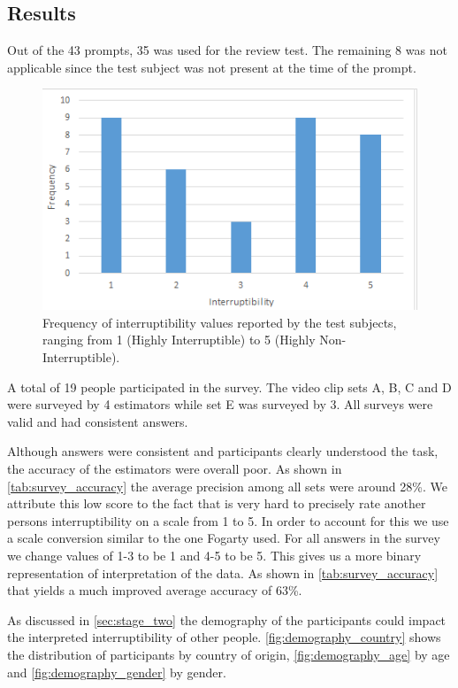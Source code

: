 \documentclass{sigchi}
\begin{document}
\subsection{Results}
Out of the 43 prompts, 35 was used for the review test.
The remaining 8 was not applicable since the test subject was not present at the time of the prompt.

\begin{figure}
  \centering
  \includegraphics[width=\columnwidth]{figures/Interruptibility_values_videotest.png}
  \caption{Frequency of interruptibility values reported by the test subjects, ranging from 1 (Highly Interruptible) to 5 (Highly Non-Interruptible).}
  \label{fig:interruptibilityFrequency}
\end{figure}

A total of 19 people participated in the survey.
The video clip sets A, B, C and D were surveyed by 4 estimators while set E was surveyed by 3.
All surveys were valid and had consistent answers.

Although answers were consistent and participants clearly understood the task, the accuracy of the estimators were overall poor.
As shown in \autoref{tab:survey_accuracy} the average precision among all sets were around 28\%.
We attribute this low score to the fact that is very hard to precisely rate another persons interruptibility on a scale from 1 to 5.
In order to account for this we use a scale conversion similar to the one Fogarty used.
For all answers in the survey we change values of 1-3 to be 1 and 4-5 to be 5.
This gives us a more binary representation of interpretation of the data.
As shown in \autoref{tab:survey_accuracy} that yields a much improved average accuracy of 63\%.

As discussed in \autoref{sec:stage_two} the demography of the participants could impact the interpreted interruptibility of other people.
\autoref{fig:demography_country} shows the distribution of participants by country of origin, \autoref{fig:demography_age} by age and \autoref{fig:demography_gender} by gender.
\end{document}
